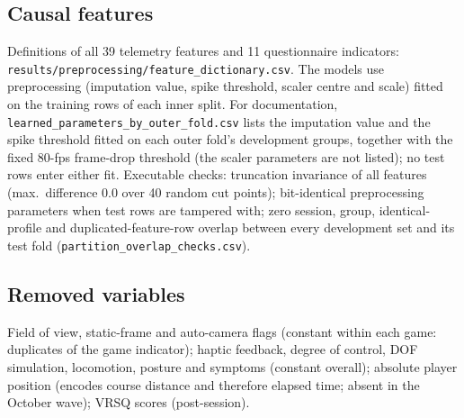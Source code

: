 \subsection{Causal features}
Definitions of all 39 telemetry features and 11 questionnaire indicators: \texttt{results/\allowbreak preprocessing/\allowbreak feature\_dictionary.csv}. The models use preprocessing (imputation value, spike threshold, scaler centre and scale) fitted on the training rows of each inner split. For documentation, \texttt{learned\_parameters\_by\_outer\_fold.csv} lists the imputation value and the spike threshold fitted on each outer fold's development groups, together with the fixed 80-fps frame-drop threshold (the scaler parameters are not listed); no test rows enter either fit. Executable checks: truncation invariance of all features (max.\ difference 0.0 over 40 random cut points); bit-identical preprocessing parameters when test rows are tampered with; zero session, group, identical-profile and duplicated-feature-row overlap between every development set and its test fold (\texttt{partition\_overlap\_checks.csv}).

\subsection{Removed variables}
Field of view, static-frame and auto-camera flags (constant within each game: duplicates of the game indicator); haptic feedback, degree of control, DOF simulation, locomotion, posture and symptoms (constant overall); absolute player position (encodes course distance and therefore elapsed time; absent in the October wave); VRSQ scores (post-session).
